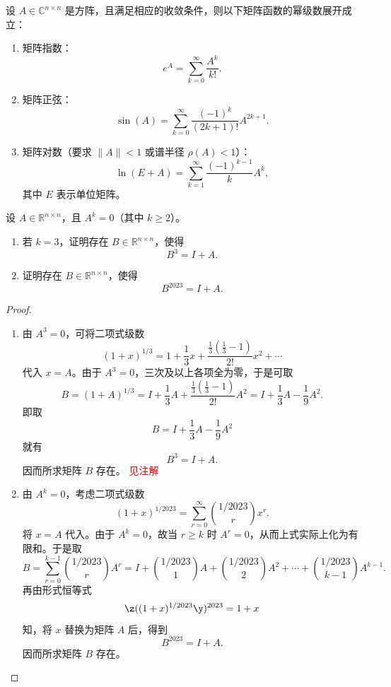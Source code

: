 \begin{lemma}[矩阵级数展开]
设 \(A \in \mathbb{C}^{n \times n}\) 是方阵，且满足相应的收敛条件，则以下矩阵函数的幂级数展开成立：
\begin{enumerate}
    \item 矩阵指数：
    \[
    e^{A} = \sum_{k=0}^{\infty} \frac{A^k}{k!}.
    \]

    \item 矩阵正弦：
    \[
    \sin(A) = \sum_{k=0}^{\infty} \frac{(-1)^k}{(2k+1)!} A^{2k+1}.
    \]

    \item 矩阵对数（要求 \(\|A\| < 1\) 或谱半径 \(\rho(A) < 1\)）：
    \[
    \ln(E + A) = \sum_{k=1}^{\infty} \frac{(-1)^{k-1}}{k} A^k,
    \]
    其中 \(E\) 表示单位矩阵。
\end{enumerate}
\end{lemma}

\begin{example}[复旦2025]
设 \(A\in \mathbb{R}^{n\times n}\)，且 \(A^k=0\)（其中 \(k\ge 2\)）。

\begin{enumerate}
    \item 若 \(k=3\)，证明存在 \(B\in \mathbb{R}^{n\times n}\)，使得
    \[
    B^3=I+A.
    \]
    \item 证明存在 \(B\in \mathbb{R}^{n\times n}\)，使得
    \[
    B^{2023}=I+A.
    \]
\end{enumerate}
\end{example}

\begin{proof}
\begin{enumerate}
    \item 由 \(A^3=0\)，可将二项式级数
    \[
    (1+x)^{1/3}
    =1+\frac13x+\frac{\frac13(\frac13-1)}{2!}x^2+\cdots
    \]
    代入 \(x=A\)。由于 \(A^3=0\)，三次及以上各项全为零，于是可取
    \[
    B=(1+A)^{1/3}=I+\frac13A+\frac{\frac13(\frac13-1)}{2!}A^2
    =I+\frac13A-\frac19A^2.
    \]
    即取
    \[ B = I+\frac13A-\frac19A^2\]
    就有
    \[
    B^3=I+A.
    \]
    因而所求矩阵 \(B\) 存在。 \textcolor{red}{见注解}

    \item 由 \(A^k=0\)，考虑二项式级数
    \[
    (1+x)^{1/2023}
    =\sum_{r=0}^{\infty}\binom{1/2023}{r}x^r.
    \]
    将 \(x=A\) 代入。由于 \(A^k=0\)，故当 \(r\ge k\) 时 \(A^r=0\)，从而上式实际上化为有限和。于是取
    \[
    B=\sum_{r=0}^{k-1}\binom{1/2023}{r}A^r
    =I+\binom{1/2023}{1}A+\binom{1/2023}{2}A^2+\cdots+\binom{1/2023}{k-1}A^{k-1}.
    \]
    再由形式恒等式
    \[
    \z((1+x)^{1/2023}\y)^{2023}=1+x
    \]
    知，将 \(x\) 替换为矩阵 \(A\) 后，得到
    \[
    B^{2023}=I+A.
    \]
    因而所求矩阵 \(B\) 存在。
\end{enumerate}
\end{proof}

